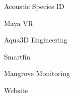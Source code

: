 \item Acoustic Species ID
\item Maya VR
\item Aqua3D Engineering
\item Smartfin
\item Mangrove Monitoring
\item Website
